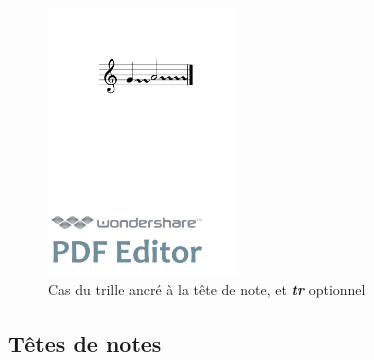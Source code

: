 \documentclass[a4paper,10pt,twocolumn]{article}
\newenvironment{code}
  {\fontfamily{pnc}\selectfont}{}
\begin{document}
\begin{figure}[h]
\centering
\begin{code}
[ \textbackslash{}trill\textless{}tr="false", anchor="note"\textgreater{}( \{g\} \{a/2\} ) ]
\end{code}
\includegraphics[width=5cm]{img/trillanchor.pdf}
\caption{Cas du trille ancré à la tête de note, et \textit{\textbf{tr}} optionnel}
\label{fig:trillanchor}
\end{figure}

\subsection{Têtes de notes}
\end{document}
